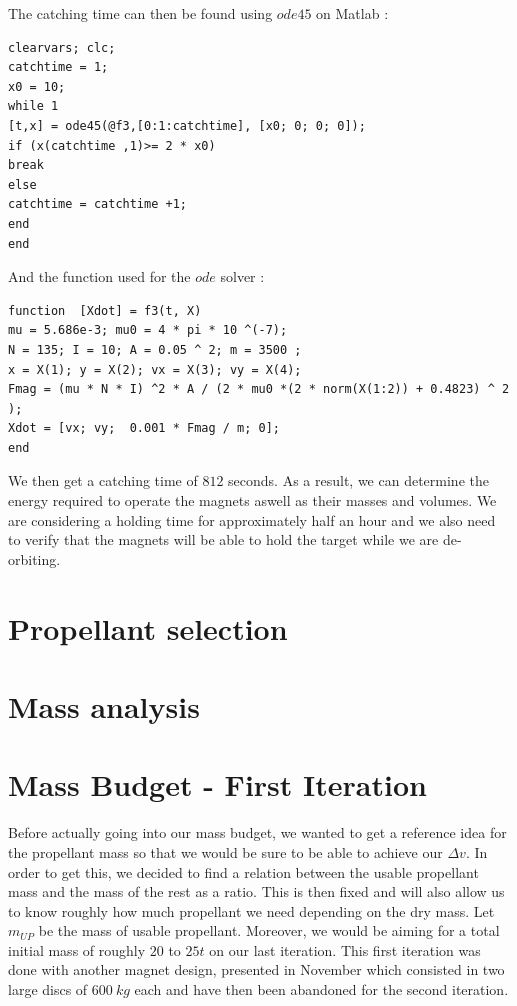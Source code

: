 The catching time can then be found using $ode45$ on Matlab :
\begin{verbatim}
clearvars; clc;
catchtime = 1;
x0 = 10;
while 1
[t,x] = ode45(@f3,[0:1:catchtime], [x0; 0; 0; 0]);
if (x(catchtime ,1)>= 2 * x0)
break
else
catchtime = catchtime +1;
end
end
\end{verbatim}
And the function used for the $ode$ solver :
\begin{verbatim}
function  [Xdot] = f3(t, X)
mu = 5.686e-3; mu0 = 4 * pi * 10 ^(-7);
N = 135; I = 10; A = 0.05 ^ 2; m = 3500 ;
x = X(1); y = X(2); vx = X(3); vy = X(4);
Fmag = (mu * N * I) ^2 * A / (2 * mu0 *(2 * norm(X(1:2)) + 0.4823) ^ 2 );
Xdot = [vx; vy;  0.001 * Fmag / m; 0]; 
end
\end{verbatim}
We then get a catching time of $812$ seconds. As a result, we can determine the energy required to operate the magnets aswell as their masses and volumes. We are considering a holding time for approximately half an hour and we also need to verify that the magnets will be able to hold the target while we are de-orbiting.

\newpage
\section{Propellant selection}
\newpage
\section{Mass analysis}
\newpage
\hypertarget{header-n0}{%
	\section{Mass Budget - First Iteration}\label{header-n0}}

\qquad Before actually going into our mass budget, we wanted to get a reference
idea for the propellant mass so that we would be sure to be able to
achieve our \(\Delta v\). In order to get this, we decided to find a
relation between the usable propellant mass and the mass of the rest as
a ratio. This is then fixed and will also allow us to know roughly how
much propellant we need depending on the dry mass. Let \(m_{UP}\) be the
mass of usable propellant. Moreover, we would be aiming for a total initial mass of roughly $20$ to $25t$ on our last iteration. This first iteration was done with another magnet design, presented in November which consisted in two large discs of $600\ kg$ each and have then been abandoned for the second iteration.

